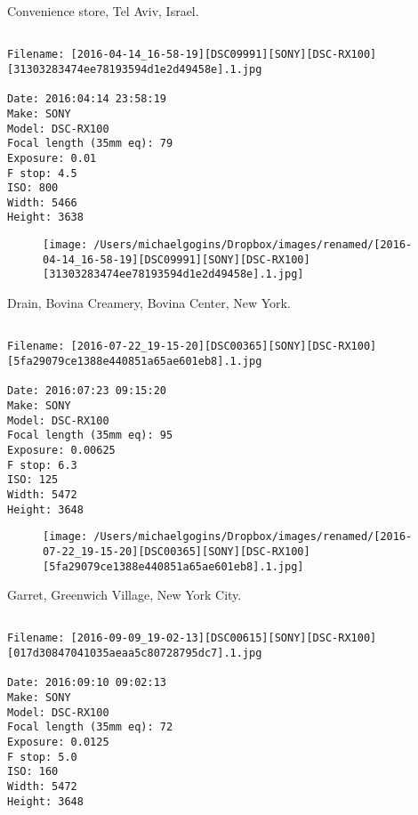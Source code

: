 \clearpage
\onecolumn
\noindent Convenience store, Tel Aviv, Israel.
\noindent
\begin{lstlisting}

Filename: [2016-04-14_16-58-19][DSC09991][SONY][DSC-RX100][31303283474ee78193594d1e2d49458e].1.jpg

Date: 2016:04:14 23:58:19
Make: SONY
Model: DSC-RX100
Focal length (35mm eq): 79
Exposure: 0.01
F stop: 4.5
ISO: 800
Width: 5466
Height: 3638
\end{lstlisting}
\clearpage

\begin{figure}
\texttt{[image: /Users/michaelgogins/Dropbox/images/renamed/[2016-04-14\_16-58-19][DSC09991][SONY][DSC-RX100][31303283474ee78193594d1e2d49458e].1.jpg]}
\end{figure}
    
\clearpage
\onecolumn
\noindent Drain, Bovina Creamery, Bovina Center, New York.
\noindent
\begin{lstlisting}

Filename: [2016-07-22_19-15-20][DSC00365][SONY][DSC-RX100][5fa29079ce1388e440851a65ae601eb8].1.jpg

Date: 2016:07:23 09:15:20
Make: SONY
Model: DSC-RX100
Focal length (35mm eq): 95
Exposure: 0.00625
F stop: 6.3
ISO: 125
Width: 5472
Height: 3648
\end{lstlisting}
\clearpage

\begin{figure}
\texttt{[image: /Users/michaelgogins/Dropbox/images/renamed/[2016-07-22\_19-15-20][DSC00365][SONY][DSC-RX100][5fa29079ce1388e440851a65ae601eb8].1.jpg]}
\end{figure}
    
\clearpage
\onecolumn
\noindent Garret, Greenwich Village, New York City.
\noindent
\begin{lstlisting}

Filename: [2016-09-09_19-02-13][DSC00615][SONY][DSC-RX100][017d30847041035aeaa5c80728795dc7].1.jpg

Date: 2016:09:10 09:02:13
Make: SONY
Model: DSC-RX100
Focal length (35mm eq): 72
Exposure: 0.0125
F stop: 5.0
ISO: 160
Width: 5472
Height: 3648
\end{lstlisting}
\clearpage

